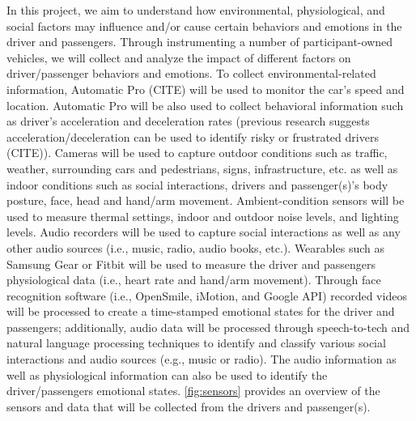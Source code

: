   In this project, we aim to understand how environmental, physiological, and social factors may influence and/or cause certain behaviors and emotions in the driver and passengers. Through instrumenting a number of participant-owned vehicles, we will collect and analyze the impact of different factors on driver/passenger behaviors and emotions. To collect environmental-related information, Automatic Pro (CITE) will be used to monitor the car's speed and location. Automatic Pro will be also used to collect behavioral information such as driver's acceleration and deceleration rates (previous research suggests acceleration/deceleration can be used to identify risky or frustrated drivers (CITE)). Cameras will be used to capture outdoor conditions such as traffic, weather, surrounding cars and pedestrians, signs, infrastructure, etc. as well as indoor conditions such as social interactions, drivers and passenger(s)'s body posture, face, head and hand/arm movement. Ambient-condition sensors will be used to measure thermal settings, indoor and outdoor noise levels, and lighting levels. Audio recorders will be used to capture social interactions as well as any other audio sources (i.e., music, radio, audio books, etc.). Wearables such as Samsung Gear or Fitbit will be used to measure the driver and passengers physiological data (i.e., heart rate and hand/arm movement). Through face recognition software (i.e., OpenSmile, iMotion, and Google API) recorded videos will be processed to create a time-stamped emotional states for the driver and passengers; additionally, audio data will be processed through speech-to-tech and natural language processing techniques to identify and classify various social interactions and audio sources (e.g., music or radio). The audio information as well as physiological information can also be used to identify the driver/passengers emotional states. \ref{fig:sensors} provides an overview of the sensors and data that will be collected from the drivers and passenger(s).   

